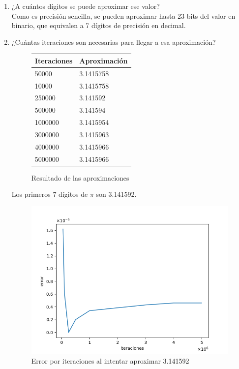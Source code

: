 \documentclass{article}
\begin{document}
\begin{enumerate}
{\begin{enumerate}
                \item ¿A cuántos dígitos se puede aproximar ese valor?\\
                Como es precisión sencilla, se pueden aproximar hasta 23 bits
                del valor en binario, que equivalen a 7 dígitos de precisión en
                decimal\cite{ieee flot32 std}.
                \item ¿Cuántas iteraciones son necesarias para llegar a esa
                aproximación? \\
                \begin{figure}[H]
                    \centering
                    \caption{Resultado de las aproximaciones}
                    \label{appVal}
                    \begin{tabular}{|l|l|}
                        \hline
                        Iteraciones & Aproximación \\ \hline
                        50000       & 3.1415758    \\ \hline
                        10000       & 3.1415758    \\ \hline
                        250000      & 3.141592     \\ \hline
                        500000      & 3.141594     \\ \hline
                        1000000     & 3.1415954    \\ \hline
                        3000000     & 3.1415963    \\ \hline
                        4000000     & 3.1415966    \\ \hline
                        5000000     & 3.1415966      \\ \hline
                    \end{tabular}
                \end{figure}
                Los primeros 7 dígitos de $\pi$ son 3.141592\cite{pi dig}.
                \begin{figure}[H]
                    \centering
                    \caption{Error por iteraciones al intentar aproximar 3.141592}
                    \label{err}
                    \includegraphics[scale=0.5]{python/error.png}

\end{figure}
\end{enumerate}}
\end{enumerate}
\end{document}
